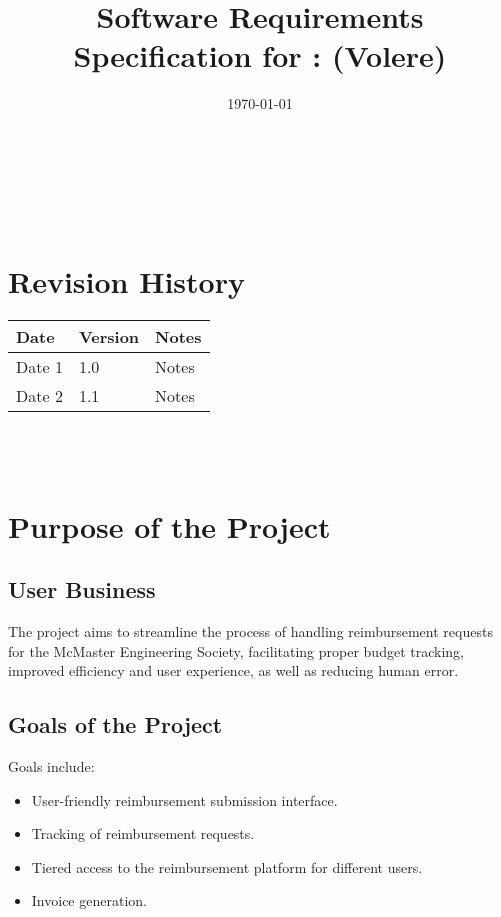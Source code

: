 \documentclass[12pt]{article}
\begin{document}
\title{Software Requirements Specification for \progname: (Volere)} 
\author{\authname}
\date{\today}
	
\maketitle

~\newpage


\tableofcontents

~\newpage

\section*{Revision History}

\begin{tabularx}{\textwidth}{p{3cm}p{2cm}X}
\toprule {\textbf{Date}} & {\textbf{Version}} & {\textbf{Notes}}\\
\midrule
Date 1 & 1.0 & Notes\\
Date 2 & 1.1 & Notes\\
\bottomrule
\end{tabularx}

~\\

~\newpage
\section{Purpose of the Project}
\subsection{User Business}
The project aims to streamline the process of handling reimbursement requests for the McMaster Engineering Society, facilitating proper budget tracking, improved efficiency and user experience, as well as reducing human error.

\subsection{Goals of the Project}
Goals include:
\begin{itemize}
    \item User-friendly reimbursement submission interface.
    \item Tracking of reimbursement requests.
    \item Tiered access to the reimbursement platform for different users.
    \item Invoice generation.
\end{itemize}
\end{document}
